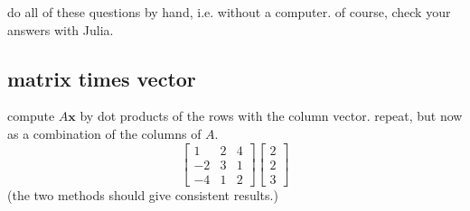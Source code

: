\documentclass[addpoints]{exam}
\begin{document}
do all of these questions by hand, i.e. without a computer. of course, check your answers with Julia.

\begin{questions}
\subsection*{matrix times vector}
%
%

\question compute $A \mathbf{x}$ by dot products of the rows with the column vector. repeat, but now as a combination of the columns of $A$. 
\begin{equation*}
	\begin{bmatrix}
	1 & 2 & 4 \\
	-2 & 3 & 1 \\
	-4 & 1 & 2
	\end{bmatrix}
	\begin{bmatrix}
	 2 \\
	 2 \\
	 3
	\end{bmatrix}
\end{equation*}
(the two methods should give consistent results.)


\end{questions}
\end{document}
